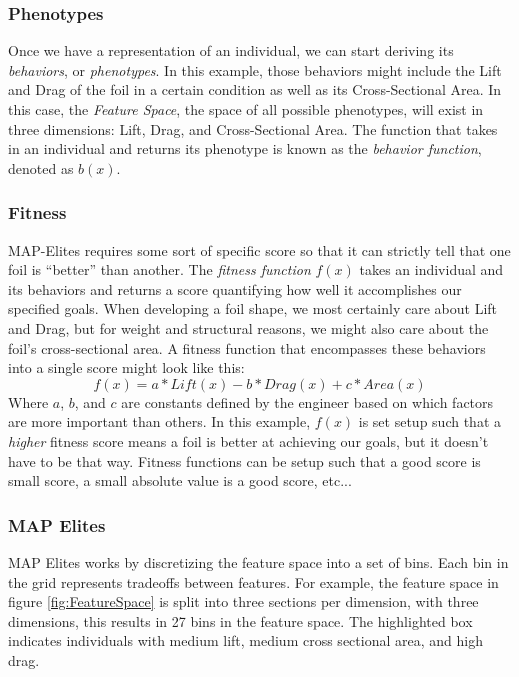 \documentclass{sig-alternate}
\begin{document}
\subsubsection{Phenotypes}
\label{sec:phenotypes}

Once we have a representation of an individual, we can start deriving its \textit{behaviors}, or \textit{phenotypes}.
In this example, those behaviors might include the Lift and Drag of the foil in a certain condition as well as its Cross-Sectional Area.
In this case, the \textit{Feature Space}, the space of all possible phenotypes, will exist in three dimensions: Lift, Drag, and Cross-Sectional Area.
The function that takes in an individual and returns its phenotype is known as the \textit{behavior function}, denoted as $b(x)$.

\subsubsection{Fitness}
\label{sec:fitness}

MAP-Elites requires some sort of specific score so that it can strictly tell that one foil is ``better'' than another.
The \textit{fitness function} $f(x)$ takes an individual and its behaviors and returns a score quantifying how well it accomplishes our specified goals.
When developing a foil shape, we most certainly care about Lift and Drag, but for weight and structural reasons, we might also care about the foil's cross-sectional area.
A fitness function that encompasses these behaviors into a single score might look like this:
$$f(x) = a*\textit{Lift}(x) - b *Drag(x) + c*Area(x)$$
Where $a$, $b$, and $c$ are constants defined by the engineer based on which factors are more important than others.
In this example, $f(x)$ is set setup such that a \textit{higher} fitness score means a foil is better at achieving our goals, but it doesn't have to be that way.
Fitness functions can be setup such that a good score is small score, a small absolute value is a good score, etc...

\subsubsection{MAP Elites}

MAP Elites works by discretizing the feature space into a set of bins.
Each bin in the grid represents tradeoffs between features.
For example, the feature space in figure \ref{fig:FeatureSpace} is split into three sections per dimension, with three dimensions, this results in 27 bins in the feature space.
The highlighted box indicates individuals with medium lift, medium cross sectional area, and high drag.
\end{document}
